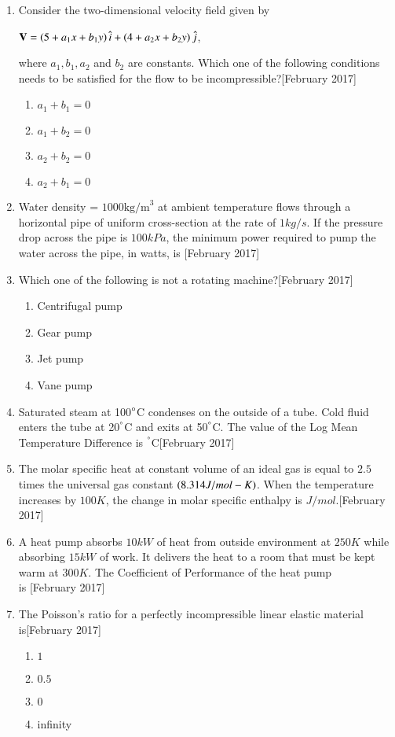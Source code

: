 \documentclass[journal]{IEEEtran}
\begin{document}
\begin{enumerate}
\item Consider the two-dimensional velocity field given by 
\begin{center}
$\mathbf{V} = \left(5 + a_1 x + b_1 y\right) \hat{i} + \left(4 + a_2 x + b_2 y\right) \hat{j}$,
\end{center}where $ a_1, b_1, a_2 $ and  $b_2$ are constants. Which one of the following conditions needs to be satisfied for the flow to be incompressible?\hfill[February 2017]
\begin{enumerate}
    \item $a_1 + b_1 = 0$
    \item $a_1 + b_2 = 0$
    \item $a_2 + b_2 = 0$
    \item $a_2 + b_1 = 0$
\end{enumerate}
\item Water density = $1000\text{kg/m}^3$ at ambient temperature flows through a horizontal pipe of uniform cross-section at the rate of $1 kg/s$. If the pressure drop across the pipe is $100 kPa$, the minimum power required to pump the water across the pipe, in watts, is\underline{\hspace{2cm}} \hfill[February 2017]
\item Which one of the following is not a rotating machine?\hfill[February 2017]
\begin{enumerate}
    \item Centrifugal pump
    \item Gear pump
    \item Jet pump
    \item Vane pump
\end{enumerate}
\item Saturated steam at 100$\degree$C condenses on the outside of a tube. Cold fluid enters the tube at 20$^\degree$C and exits at 50$^\degree$C. The value of the Log Mean Temperature Difference  is\underline{\hspace{2cm}} $^\degree$C\hfill[February 2017]
\item The molar specific heat at constant volume of an ideal gas is equal to $2.5$ times the universal gas constant $\left(8.314 J/mol-K\right)$. When the temperature increases by $100 K$, the change in molar specific enthalpy is \underline{\hspace{2cm}} $J/mol$.\hfill[February 2017]
\item A heat pump absorbs $10 kW$ of heat from outside environment at $250 K$ while absorbing $15 kW$ of work. It delivers the heat to a room that must be kept warm at $300 K$. The Coefficient of Performance   of the heat pump \\is \underline{\hspace{2cm}}\hfill[February 2017]
\item The Poisson's ratio for a perfectly incompressible linear elastic material \\is\hfill[February 2017]
\begin{enumerate}
    \item $1$
    \item $0.5$
    \item $0$
    \item infinity
\end{enumerate}
\end{enumerate}
\end{document}
